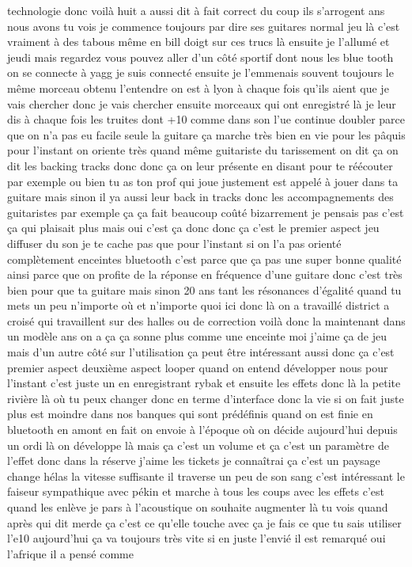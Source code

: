  technologie donc voilà huit a aussi dit à fait correct du coup ils s'arrogent ans nous avons tu vois je commence toujours par dire ses guitares normal jeu là c'est vraiment à des tabous même en bill doigt sur ces trucs là ensuite je l'allumé et jeudi mais regardez vous pouvez aller d'un côté sportif dont nous les blue tooth on se connecte à yagg je suis connecté ensuite je l'emmenais souvent toujours le même morceau obtenu l'entendre on est à lyon à chaque fois qu'ils aient que je vais chercher donc je vais chercher ensuite morceaux qui ont enregistré là je leur dis à chaque fois les truites dont +10 comme dans son l'ue continue doubler parce que on n'a pas eu facile seule la guitare ça marche très bien en vie pour les pâquis pour l'instant on oriente très quand même guitariste du tarissement on dit ça on dit les backing tracks donc donc ça on leur présente en disant pour te réécouter par exemple ou bien tu as ton prof qui joue justement est appelé à jouer dans ta guitare mais sinon il ya aussi leur back in tracks donc les accompagnements des guitaristes par exemple ça ça fait beaucoup coûté bizarrement je pensais pas c'est ça qui plaisait plus mais oui c'est ça donc donc ça c'est le premier aspect jeu diffuser du son je te cache pas que pour l'instant si on l'a pas orienté complètement enceintes bluetooth c'est parce que ça pas une super bonne qualité ainsi parce que on profite de la réponse en fréquence d'une guitare donc c'est très bien pour que ta guitare mais sinon 20 ans tant les résonances d'égalité quand tu mets un peu n'importe où et n'importe quoi ici donc là on a travaillé district a croisé qui travaillent sur des halles ou de correction voilà donc la maintenant dans un modèle ans on a ça ça sonne plus comme une enceinte moi j'aime ça de jeu mais d'un autre côté sur l'utilisation ça peut être intéressant aussi donc ça c'est premier aspect deuxième aspect looper quand on entend développer nous pour l'instant c'est juste un en enregistrant rybak et ensuite les effets donc là la petite rivière là où tu peux changer donc en terme d'interface donc la vie si on fait juste plus est moindre dans nos banques qui sont prédéfinis quand on est finie en bluetooth en amont en fait on envoie à l'époque où on décide aujourd'hui depuis un ordi là on développe là mais ça c'est un volume et ça c'est un paramètre de l'effet donc dans la réserve j'aime les tickets je connaîtrai ça c'est un paysage change hélas la vitesse suffisante il traverse un peu de son sang c'est intéressant le faiseur sympathique avec pékin et marche à tous les coups avec les effets c'est quand les enlève je pars à l'acoustique on souhaite augmenter là tu vois quand après qui dit merde ça c'est ce qu'elle touche avec ça je fais ce que tu sais utiliser l'e10 aujourd'hui ça va toujours très vite si en juste l'envié il est remarqué oui l'afrique il a pensé comme 
